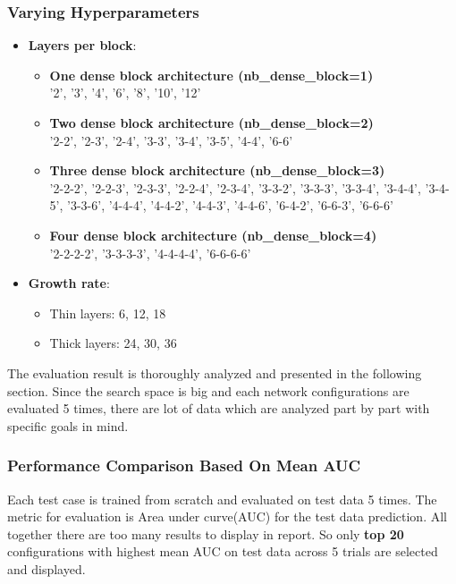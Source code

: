 \subsubsection{Varying Hyperparameters}
\begin{itemize}
 \item \textbf{Layers per block}:
 \begin{itemize}
 \item \textbf{One dense block architecture (nb\_dense\_block=1)}\\
 '2', '3', '4', '6', '8', '10', '12'
 \item \textbf{Two dense block architecture (nb\_dense\_block=2)}\\
 '2-2', '2-3', '2-4', '3-3', '3-4', '3-5', '4-4', '6-6'
 \item \textbf{Three dense block architecture (nb\_dense\_block=3)}\\
 '2-2-2', '2-2-3', '2-3-3', '2-2-4', '2-3-4', '3-3-2', '3-3-3', '3-3-4', '3-4-4', '3-4-5', '3-3-6', '4-4-4', '4-4-2', '4-4-3', '4-4-6', '6-4-2', '6-6-3', '6-6-6'
 \item \textbf{Four dense block architecture (nb\_dense\_block=4)}\\
 '2-2-2-2', '3-3-3-3', '4-4-4-4', '6-6-6-6'
 \end{itemize}
 \item \textbf{Growth rate}:
 \begin{itemize}
 \item Thin layers: 6, 12, 18
 \item Thick layers: 24, 30, 36
 \end{itemize}
 
\end{itemize}

The evaluation result is thoroughly analyzed and presented in the following section. Since the search space is big and each network configurations are evaluated 5 times, there are lot of data which are analyzed part by part
with specific goals in mind.

\subsubsection{Performance Comparison Based On Mean AUC}
Each test case is trained from scratch and evaluated on test data 5 times. The metric for evaluation is Area under curve(AUC) for the test data prediction. All together there are too many results to display in report. 
So only \textbf{top 20} configurations with highest mean AUC on test data across 5 trials are selected and displayed. 

